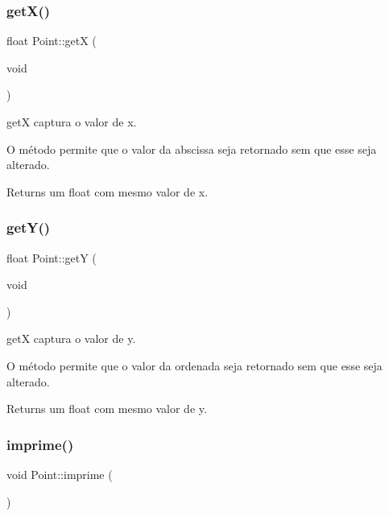 \subsubsection{\texorpdfstring{get\+X()}{getX()}}
{\footnotesize\ttfamily float Point\+::getX (\begin{DoxyParamCaption}\item[{void}]{ }\end{DoxyParamCaption})}



getX captura o valor de x. 

O método permite que o valor da abscissa seja retornado sem que esse seja alterado.

\begin{DoxyReturn}{Returns}
um float com mesmo valor de x. 
\end{DoxyReturn}
\mbox{\label{class_point_a2444daa96871c89614510bc4bfcd19ce}} 
\subsubsection{\texorpdfstring{get\+Y()}{getY()}}
{\footnotesize\ttfamily float Point\+::getY (\begin{DoxyParamCaption}\item[{void}]{ }\end{DoxyParamCaption})}



getX captura o valor de y. 

O método permite que o valor da ordenada seja retornado sem que esse seja alterado.

\begin{DoxyReturn}{Returns}
um float com mesmo valor de y. 
\end{DoxyReturn}
\mbox{\label{class_point_a1fb5c2501c27ab2cbc99d06c2a26a741}} 
\subsubsection{\texorpdfstring{imprime()}{imprime()}}
{\footnotesize\ttfamily void Point\+::imprime (\begin{DoxyParamCaption}{ }\end{DoxyParamCaption})}



